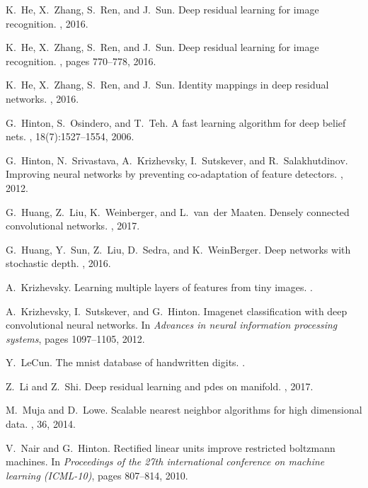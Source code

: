 \documentclass{article}
\begin{document}
\begin{thebibliography}{10}
K.~He, X.~Zhang, S.~Ren, and J.~Sun.
\newblock Deep residual learning for image recognition.
, 2016.

K.~He, X.~Zhang, S.~Ren, and J.~Sun.
\newblock Deep residual learning for image recognition.
, pages 770--778, 2016.

K.~He, X.~Zhang, S.~Ren, and J.~Sun.
\newblock Identity mappings in deep residual networks.
, 2016.

G.~Hinton, S.~Osindero, and T.~Teh.
\newblock A fast learning algorithm for deep belief nets.
, 18(7):1527--1554, 2006.

G.~Hinton, N.~Srivastava, A.~Krizhevsky, I.~Sutskever, and R.~Salakhutdinov.
\newblock Improving neural networks by preventing co-adaptation of feature
  detectors.
, 2012.

G.~Huang, Z.~Liu, K.~Weinberger, and L.~van~der Maaten.
\newblock Densely connected convolutional networks.
, 2017.

G.~Huang, Y.~Sun, Z.~Liu, D.~Sedra, and K.~WeinBerger.
\newblock Deep networks with stochastic depth.
, 2016.

A.~Krizhevsky.
\newblock Learning multiple layers of features from tiny images.
.

A.~Krizhevsky, I.~Sutskever, and G.~Hinton.
\newblock Imagenet classification with deep convolutional neural networks.
\newblock In {\em Advances in neural information processing systems}, pages
  1097--1105, 2012.

Y.~LeCun.
\newblock The mnist database of handwritten digits.
.

Z.~Li and Z.~Shi.
\newblock Deep residual learning and pdes on manifold.
, 2017.

M.~Muja and D.~Lowe.
\newblock Scalable nearest neighbor algorithms for high dimensional data.
, 36, 2014.

V.~Nair and G.~Hinton.
\newblock Rectified linear units improve restricted boltzmann machines.
\newblock In {\em Proceedings of the 27th international conference on machine
  learning (ICML-10)}, pages 807--814, 2010.


\end{thebibliography}
\end{document}
